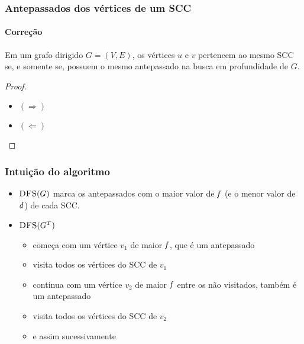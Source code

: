 \documentclass{beamer}
\begin{document}

\begin{frame}
\frametitle{Antepassados dos vértices de um SCC}
\framesubtitle{Correção}

\begin{theorem}
Em um grafo dirigido $G = (V, E)$, os vértices $u$ e $v$ pertencem ao
mesmo SCC se, e somente se, possuem o mesmo antepassado na busca em
profundidade de $G$.
\end{theorem}

\pause
\begin{proof}
\begin{itemize}
\item $(\Rightarrow)$ 
\item $(\Leftarrow)$ 
\end{itemize}
\end{proof}
\end{frame}


\begin{frame}
\frametitle{Intuição do algoritmo}

\begin{itemize}
\item $\textnormal{\scshape DFS}(G)$ marca os antepassados com o maior valor de
  $\id{f}$ (e o menor valor de $\id{d}$) de cada SCC.
\item $\textnormal{\scshape DFS}(G^T)$ 
\begin{itemize}
\item começa com um vértice $v_1$ de maior $\id{f}$, que é um antepassado
\item visita todos os vértices do SCC de $v_1$
\item continua com um vértice $v_2$ de maior $\id{f}$ entre os não visitados,
também é um antepassado
\item visita todos os vértices do SCC de $v_2$
\item e assim sucessivamente
\end{itemize}
\end{itemize}
\end{frame}
\end{document}
